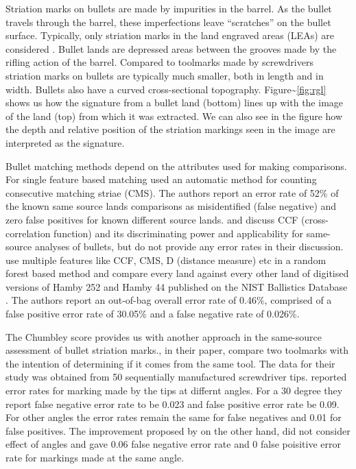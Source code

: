 \documentclass[12pt]{article}
\begin{document}
Striation marks on bullets are made by impurities in the barrel. As the
bullet travels through the barrel, these imperfections leave
``scratches'' on the bullet surface. Typically, only striation marks in
the land engraved areas (LEAs) are considered \citet{afte-article1992}.
Bullet lands are depressed areas between the grooves made by the rifling
action of the barrel. Compared to toolmarks made by screwdrivers
striation marks on bullets are typically much smaller, both in length
and in width. Bullets also have a curved cross-sectional topography.
Figure\textasciitilde{}\ref{fig:rgl} shows us how the signature from a
bullet land (bottom) lines up with the image of the land (top) from
which it was extracted. We can also see in the figure how the depth and
relative position of the striation markings seen in the image are
interpreted as the signature.

Bullet matching methods depend on the attributes used for making
comparisons. For single feature based matching \citet{chu2013} used an
automatic method for counting consecutive matching striae (CMS). The
authors report an error rate of 52\% of the known same source lands
comparisons as misidentified (false negative) and zero false positives
for known different source lands. \citet{ma2004} and
\citet{vorburger2011} discuss CCF (cross-correlation function) and its
discriminating power and applicability for same-source analyses of
bullets, but do not provide any error rates in their discussion.
\citet{aoas} use multiple features like CCF, CMS, D (distance measure)
etc in a random forest based method and compare every land against every
other land of digitised versions of Hamby 252 and Hamby 44 \citet{hamby}
published on the NIST Ballistics Database \citep{nist}. The authors
report an out-of-bag overall error rate of 0.46\%, comprised of a false
positive error rate of 30.05\% and a false negative rate of 0.026\%.

The Chumbley score provides us with another approach in the same-source
assessment of bullet striation marks.\citet{chumbley}, in their paper,
compare two toolmarks with the intention of determining if it comes from
the same tool. The data for their study was obtained from 50
sequentially manufactured screwdriver tips.\citet{chumbley} reported
error rates for marking made by the tips at differnt angles. For a 30
degree they report false negative error rate to be 0.023 and false
positive error rate be 0.09. For other angles the error rates remain the
same for false negatives and 0.01 for false positives. The improvement
proposed by \citet{hadler} on the other hand, did not consider effect of
angles and gave 0.06 false negative error rate and 0 false poisitive
error rate for markings made at the same angle.
\end{document}
